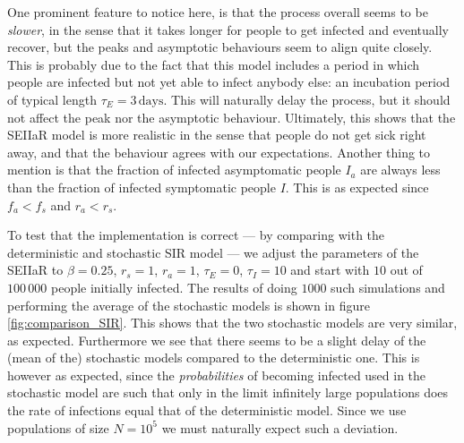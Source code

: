 One prominent feature to notice here, is that the process overall seems to be \textit{slower}, in the sense that it takes longer for people to get infected and eventually recover, but the peaks and asymptotic behaviours seem to align quite closely. This is probably due to the fact that this model includes a period in which people are infected but not yet able to infect anybody else: an incubation period of typical length $\tau_E = 3 \, \mathrm{days}$. This will naturally delay the process, but it should not affect the peak nor the asymptotic behaviour. Ultimately, this shows that the SEIIaR model is more realistic in the sense that people do not get sick right away, and that the behaviour agrees with our expectations. Another thing to mention is that the fraction of infected asymptomatic people $I_a$ are always less than the fraction of infected symptomatic people $I$. This is as expected since $f_a < f_s$ and $r_a < r_s$.

To test that the implementation is correct --- by comparing with the deterministic and stochastic SIR model --- we adjust the parameters of the SEIIaR to $\beta = 0.25$, $r_s = 1$, $r_a = 1$, $\tau_E = 0$, $\tau_I= 10$ and start with $10$ out of $100 \, 000$ people initially infected. The results of doing $1000$ such simulations and performing the average of the stochastic models is shown in figure \ref{fig:comparison_SIR}. This shows that the two stochastic models are very similar, as expected. Furthermore we see that there seems to be a slight delay of the (mean of the) stochastic models compared to the deterministic one. This is however as expected, since the \textit{probabilities} of becoming infected used in the stochastic model are such that only in the limit infinitely large populations does the rate of infections equal that of the deterministic model. Since we use populations of size $N = 10^5$ we must naturally expect such a deviation. 

